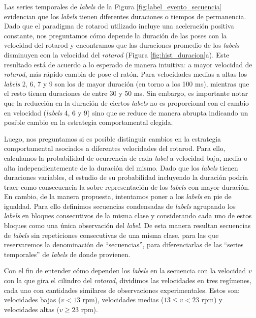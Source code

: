 Las series temporales de \textit{labels} de la Figura \ref{fig:label_evento_secuencia} evidencian que los \textit{labels} tienen diferentes duraciones o tiempos de permanencia. Dado que el paradigma de rotarod utilizado incluye una aceleración positiva constante, nos preguntamos cómo depende la duración de las poses con la velocidad del rotarod y encontramos que las duraciones promedio de los \textit{labels} disminuyen con la velocidad del \textit{rotarod} (Figura \ref{fig:hist_duracion}a). Este resultado está de acuerdo a lo esperado de manera intuitiva: a mayor velocidad de \textit{rotarod}, más rápido cambia de pose el ratón. Para velocidades medias a altas los \textit{labels} 2, 6, 7 y 9 son los de mayor duración (en torno a los 100 ms), mientras que el resto tienen duraciones de entre 30 y 50 ms. Sin embargo, es importante notar que la reducción en la duración de ciertos \textit{labels} no es proporcional con el cambio en velocidad (\textit{labels} 4, 6 y 9) sino que se reduce de manera abrupta indicando un posible cambio en la estrategia comportamental elegida.

Luego, nos preguntamos si es posible distinguir cambios en la estrategia comportamental asociados a diferentes velocidades del rotarod. Para ello, calculamos la probabilidad de ocurrencia de cada \textit{label} a velocidad baja, media o alta independientemente de la duración del mismo. Dado que los \textit{labels} tienen duraciones variables, el estudio de su probabilidad incluyendo la duración podría traer como consecuencia la sobre-representación de los \textit{labels} con mayor duración. En cambio, de la manera propuesta, intentamos poner a los \textit{labels} en pie de igualdad. Para ello definimos secuencias condensadas de \textit{labels} agrupando los \textit{labels} en bloques consecutivos de la misma clase y considerando cada uno de estos bloques como una única observación del \textit{label}. De esta manera resultan secuencias de \textit{labels} sin repeticiones consecutivas de una misma clase, para las que reservaremos la denominación de ``secuencias'', para diferenciarlas de las ``series temporales'' de \textit{labels} de donde provienen. 

Con el fin de entender cómo dependen los \textit{labels} en la secuencia con la velocidad $v$ con la que gira el cilindro del \textit{rotarod}, dividimos las velocidades en tres regímenes, cada uno con cantidades similares de observaciones experimentales. Estos son: velocidades bajas ($v < 13$ rpm), velocidades medias ($13 \leq v < 23$ rpm) y velocidades altas ($v \geq 23$ rpm).

